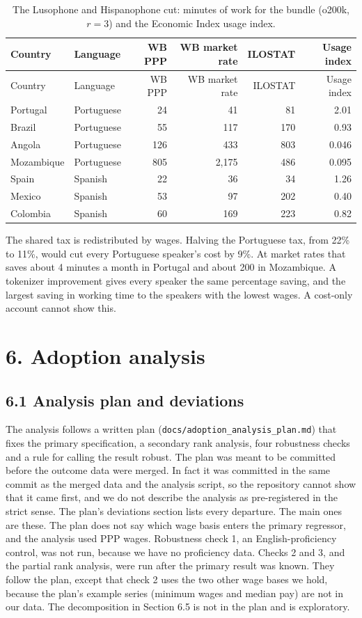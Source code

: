 \documentclass[11pt]{article}
\begin{document}
\begin{longtable}[]{@{}llrrrr@{}}
\caption{The Lusophone and Hispanophone cut: minutes of work for the bundle (o200k, \(r = 3\)) and the Economic Index usage index.}\tabularnewline
\toprule\noalign{}
Country & Language & WB PPP & WB market rate & ILOSTAT & Usage index \\
\midrule\noalign{}
\endfirsthead
\toprule\noalign{}
Country & Language & WB PPP & WB market rate & ILOSTAT & Usage index \\
\midrule\noalign{}
\endhead
\bottomrule\noalign{}
\endlastfoot
Portugal & Portuguese & 24 & 41 & 81 & 2.01 \\
Brazil & Portuguese & 55 & 117 & 170 & 0.93 \\
Angola & Portuguese & 126 & 433 & 803 & 0.046 \\
Mozambique & Portuguese & 805 & 2,175 & 486 & 0.095 \\
Spain & Spanish & 22 & 36 & 34 & 1.26 \\
Mexico & Spanish & 53 & 97 & 202 & 0.40 \\
Colombia & Spanish & 60 & 169 & 223 & 0.82 \\
\end{longtable}

The shared tax is redistributed by wages. Halving the Portuguese tax, from 22\% to 11\%, would cut every Portuguese speaker's cost by 9\%. At market rates that saves about 4 minutes a month in Portugal and about 200 in Mozambique. A tokenizer improvement gives every speaker the same percentage saving, and the largest saving in working time to the speakers with the lowest wages. A cost-only account cannot show this.

\section{6. Adoption analysis}

\subsection{6.1 Analysis plan and deviations}

The analysis follows a written plan (\texttt{docs/adoption\_analysis\_plan.md}) that fixes the primary specification, a secondary rank analysis, four robustness checks and a rule for calling the result robust. The plan was meant to be committed before the outcome data were merged. In fact it was committed in the same commit as the merged data and the analysis script, so the repository cannot show that it came first, and we do not describe the analysis as pre-registered in the strict sense. The plan's deviations section lists every departure. The main ones are these. The plan does not say which wage basis enters the primary regressor, and the analysis used PPP wages. Robustness check 1, an English-proficiency control, was not run, because we have no proficiency data. Checks 2 and 3, and the partial rank analysis, were run after the primary result was known. They follow the plan, except that check 2 uses the two other wage bases we hold, because the plan's example series (minimum wages and median pay) are not in our data. The decomposition in Section 6.5 is not in the plan and is exploratory.
\end{document}
